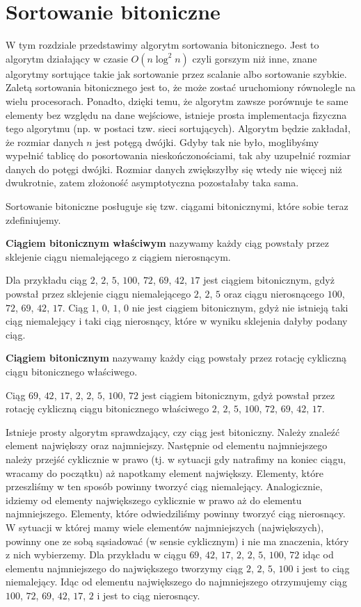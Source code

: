 \section{Sortowanie bitoniczne}

\label{sec:bitoniczne}

W tym rozdziale przedstawimy algorytm sortowania bitonicznego.
Jest to algorytm działający w czasie $O(n \log^2 n)$ czyli gorszym niż inne, znane algorytmy sortujące takie jak sortowanie przez scalanie albo sortowanie szybkie.
Zaletą sortowania bitonicznego jest to, że może zostać uruchomiony równolegle na wielu procesorach.
Ponadto, dzięki temu, że algorytm zawsze porównuje te same elementy bez względu na dane wejściowe, istnieje prosta implementacja fizyczna tego algorytmu (np. w postaci tzw. sieci sortujących).
Algorytm będzie zakładał, że rozmiar danych $n$ jest potęgą dwójki.
Gdyby tak nie było, moglibyśmy wypełnić tablicę do posortowania nieskończonościami, tak aby uzupełnić rozmiar danych do potęgi dwójki.
Rozmiar danych zwiększyłby się wtedy nie więcej niż dwukrotnie, zatem złożoność asymptotyczna pozostałaby taka sama.

Sortowanie bitoniczne posługuje się tzw. ciągami bitonicznymi, które sobie teraz zdefiniujemy.
\begin{definition}
 \textbf{Ciągiem bitonicznym właściwym} nazywamy każdy ciąg powstały przez sklejenie ciągu niemalejącego z ciągiem nierosnącym.
\end{definition}
Dla przykładu ciąg $2$, $2$, $5$, $100$, $72$, $69$, $42$, $17$ jest ciągiem bitonicznym, gdyż powstał przez sklejenie ciągu niemalejącego $2$, $2$, $5$ oraz ciągu nierosnącego $100$, $72$, $69$, $42$, $17$.
Ciąg $1$, $0$, $1$, $0$ nie jest ciągiem bitonicznym, gdyż nie istnieją taki ciąg niemalejący i taki ciąg nierosnący, które w wyniku sklejenia dałyby podany ciąg.
\begin{definition}
 \textbf{Ciągiem bitonicznym} nazywamy każdy ciąg powstały przez rotację cykliczną ciągu bitonicznego właściwego.
\end{definition}
Ciąg $69$, $42$, $17$, $2$, $2$, $5$, $100$, $72$ jest ciągiem bitonicznym, gdyż powstał przez rotację cykliczną ciągu bitonicznego właściwego $2$, $2$, $5$, $100$, $72$, $69$, $42$, $17$.

Istnieje prosty algorytm sprawdzający, czy ciąg jest bitoniczny.
Należy znaleźć element największy oraz najmniejszy.
Następnie od elementu najmniejszego należy przejść cyklicznie w prawo (tj. w sytuacji gdy natrafimy na koniec ciągu, wracamy do początku) aż napotkamy element największy.
Elementy, które przeszliśmy w ten sposób powinny tworzyć ciąg niemalejący.
Analogicznie, idziemy od elementy największego cyklicznie w prawo aż do elementu najmniejszego.
Elementy, które odwiedziliśmy powinny tworzyć ciąg nierosnący.
W sytuacji w której mamy wiele elementów najmniejszych (największych), powinny one ze sobą sąsiadować (w sensie cyklicznym) i nie ma znaczenia, który z nich wybierzemy.
Dla przykładu w ciągu  $69$, $42$, $17$, $2$, $2$, $5$, $100$, $72$ idąc od elementu najmniejszego do największego tworzymy ciąg $2$, $2$, $5$, $100$ i jest to ciąg niemalejący.
Idąc od elementu największego do najmniejszego otrzymujemy ciąg $100$, $72$, $69$, $42$, $17$, $2$ i jest to ciąg nierosnący.

